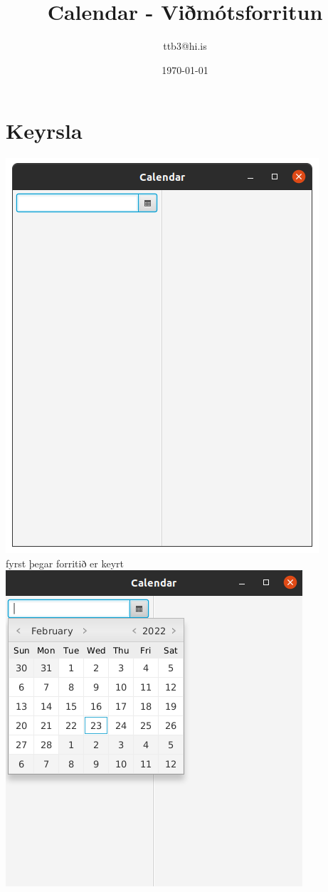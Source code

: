 \documentclass{article}
\title{Calendar - Viðmótsforritun}
\author{ttb3@hi.is}
\date{\today}
\begin{document}
\maketitle


\section*{Keyrsla}
\begin{center}
    \includegraphics[scale=0.3]{imgs/s1.png}\\
    fyrst þegar forritið er keyrt\\
    \includegraphics[scale=0.3]{imgs/s2.png}\\

\end{center}
\end{document}
